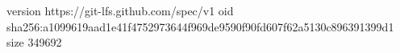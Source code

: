 version https://git-lfs.github.com/spec/v1
oid sha256:a1099619aad1e41f4752973644f969de9590f90fd607f62a5130c896391399d1
size 349692
